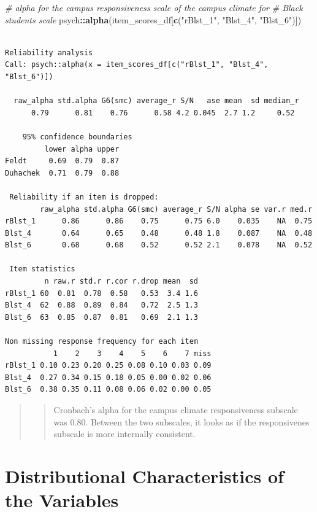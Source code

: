 \documentclass[
  11pt,
]{book}
\newenvironment{Shaded}{\begin{snugshade}}{\end{snugshade}}
\newcommand{\CommentTok}[1]{\textcolor[rgb]{0.37,0.37,0.37}{\textit{#1}}}
\newcommand{\FunctionTok}[1]{\textcolor[rgb]{0.27,0.27,0.27}{\textbf{#1}}}
\newcommand{\NormalTok}[1]{#1}
\newcommand{\SpecialCharTok}[1]{\textcolor[rgb]{0.43,0.43,0.43}{\textbf{#1}}}
\newcommand{\StringTok}[1]{\textcolor[rgb]{0.5,0.5,0.5}{#1}}
\begin{document}
\begin{Shaded}
\begin{Highlighting}[]
\CommentTok{\# alpha for the campus responsiveness scale of the campus climate for}
\CommentTok{\# Black students scale}
\NormalTok{psych}\SpecialCharTok{::}\FunctionTok{alpha}\NormalTok{(item\_scores\_df[}\FunctionTok{c}\NormalTok{(}\StringTok{"rBlst\_1"}\NormalTok{, }\StringTok{"Blst\_4"}\NormalTok{, }\StringTok{"Blst\_6"}\NormalTok{)])}
\end{Highlighting}
\end{Shaded}

\begin{verbatim}

Reliability analysis   
Call: psych::alpha(x = item_scores_df[c("rBlst_1", "Blst_4", "Blst_6")])

  raw_alpha std.alpha G6(smc) average_r S/N   ase mean  sd median_r
      0.79      0.81    0.76      0.58 4.2 0.045  2.7 1.2     0.52

    95% confidence boundaries 
         lower alpha upper
Feldt     0.69  0.79  0.87
Duhachek  0.71  0.79  0.88

 Reliability if an item is dropped:
        raw_alpha std.alpha G6(smc) average_r S/N alpha se var.r med.r
rBlst_1      0.86      0.86    0.75      0.75 6.0    0.035    NA  0.75
Blst_4       0.64      0.65    0.48      0.48 1.8    0.087    NA  0.48
Blst_6       0.68      0.68    0.52      0.52 2.1    0.078    NA  0.52

 Item statistics 
         n raw.r std.r r.cor r.drop mean  sd
rBlst_1 60  0.81  0.78  0.58   0.53  3.4 1.6
Blst_4  62  0.88  0.89  0.84   0.72  2.5 1.3
Blst_6  63  0.85  0.87  0.81   0.69  2.1 1.3

Non missing response frequency for each item
           1    2    3    4    5    6    7 miss
rBlst_1 0.10 0.23 0.20 0.25 0.08 0.10 0.03 0.09
Blst_4  0.27 0.34 0.15 0.18 0.05 0.00 0.02 0.06
Blst_6  0.38 0.35 0.11 0.08 0.06 0.02 0.00 0.05
\end{verbatim}

\begin{quote}
\begin{quote}
Cronbach's alpha for the campus climate responsiveness subscale was 0.80. Between the two subscales, it looks as if the responsivenes subscale is more internally consistent.
\end{quote}
\end{quote}

\hypertarget{distributional-characteristics-of-the-variables}{%
\section{Distributional Characteristics of the Variables}\label{distributional-characteristics-of-the-variables}}
\end{document}
